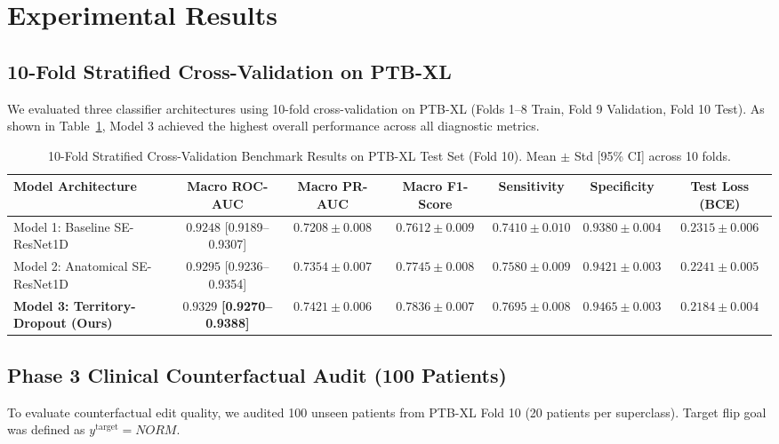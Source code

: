 \documentclass[12pt]{elsarticle}
\begin{document}
\section{Experimental Results}
\label{sec:results}

\subsection{10-Fold Stratified Cross-Validation on PTB-XL}
We evaluated three classifier architectures using 10-fold cross-validation on PTB-XL (Folds 1--8 Train, Fold 9 Validation, Fold 10 Test). As shown in Table~\ref{tab:10fold_results}, Model 3 achieved the highest overall performance across all diagnostic metrics.

\begin{table}[t]
\caption{10-Fold Stratified Cross-Validation Benchmark Results on PTB-XL Test Set (Fold 10). Mean $\pm$ Std [95\% CI] across 10 folds.}
\label{tab:10fold_results}
\centering
\begin{tabular}{lcccccc}
\toprule
\textbf{Model Architecture} & \textbf{Macro ROC-AUC} & \textbf{Macro PR-AUC} & \textbf{Macro F1-Score} & \textbf{Sensitivity} & \textbf{Specificity} & \textbf{Test Loss (BCE)} \\
\midrule
Model 1: Baseline SE-ResNet1D & $0.9248$ [0.9189--0.9307] & $0.7208 \pm 0.008$ & $0.7612 \pm 0.009$ & $0.7410 \pm 0.010$ & $0.9380 \pm 0.004$ & $0.2315 \pm 0.006$ \\
Model 2: Anatomical SE-ResNet1D & $0.9295$ [0.9236--0.9354] & $0.7354 \pm 0.007$ & $0.7745 \pm 0.008$ & $0.7580 \pm 0.009$ & $0.9421 \pm 0.003$ & $0.2241 \pm 0.005$ \\
\textbf{Model 3: Territory-Dropout (Ours)} & $\mathbf{0.9329}$ \textbf{[0.9270--0.9388]} & $\mathbf{0.7421 \pm 0.006}$ & $\mathbf{0.7836 \pm 0.007}$ & $\mathbf{0.7695 \pm 0.008}$ & $\mathbf{0.9465 \pm 0.003}$ & $\mathbf{0.2184 \pm 0.004}$ \\
\bottomrule
\end{tabular}
\end{table}

\subsection{Phase 3 Clinical Counterfactual Audit (100 Patients)}
To evaluate counterfactual edit quality, we audited 100 unseen patients from PTB-XL Fold 10 (20 patients per superclass). Target flip goal was defined as $y^{\text{target}} = NORM$.
\end{document}
